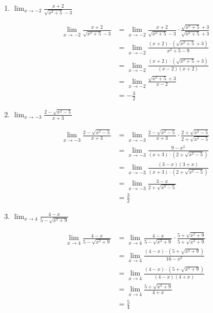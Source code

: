\documentclass[a4paper, 12pt]{article}
\begin{document}
\begin{enumerate}
    \item $\lim_{x \to -2} \frac{x+2}{\sqrt{x^2 + 5} - 3}$

    \begin{align*}
        \lim_{x \to -2} \frac{x+2}{\sqrt{x^2 + 5} - 3} &= \lim_{x \to -2} \frac{x+2}{\sqrt{x^2 + 5} - 3} \cdot  \frac{\sqrt{x^2 + 5} + 3}{\sqrt{x^2 + 5} + 3} \\
        &= \lim_{x \to -2} \frac{(x+2) \cdot (\sqrt{x^2 + 5} + 3)}{x^2 + 5 - 9}\\
        &= \lim_{x \to -2} \frac{(x+2) \cdot (\sqrt{x^2 + 5} + 3)}{(x-2)(x+2)}\\
        &= \lim_{x \to -2} \frac{\sqrt{x^2 + 5} + 3}{x-2}\\
        &= -\frac{3}{2}
    \end{align*}

    \item $\lim_{x \to -3} \frac{2-\sqrt{x^2 - 5}}{x+3}$
    
    \begin{align*}
        \lim_{x \to -3} \frac{2-\sqrt{x^2 - 5}}{x+3} &= \lim_{x \to -3} \frac{2-\sqrt{x^2 - 5}}{x+3} \cdot \frac{2+\sqrt{x^2 - 5}}{2+\sqrt{x^2 - 5}}\\
        &= \lim_{x \to -3} \frac{9 - x^2}{(x+3)\cdot (2+\sqrt{x^2 - 5})}\\
        &= \lim_{x \to -3}\frac{(3-x) (3+x)}{(x+3)\cdot (2+\sqrt{x^2 - 5})}\\
        &= \lim_{x \to -3}\frac{3-x}{2+\sqrt{x^2 - 5}}\\
        &= \frac{3}{2}
    \end{align*}

    \item $\lim_{x \to 4} \frac{4-x}{5-\sqrt{x^2 + 9}}$
    
    \begin{align*}
        \lim_{x \to 4} \frac{4-x}{5-\sqrt{x^2 + 9}} &= \lim_{x \to 4} \frac{4-x}{5-\sqrt{x^2 + 9}} \cdot \frac{5+\sqrt{x^2 + 9}}{5+\sqrt{x^2 + 9}}\\
        &= \lim_{x \to 4} \frac{(4-x)\cdot (5+\sqrt{x^2 + 9})}{16-x^2}\\
        &= \lim_{x \to 4} \frac{(4-x)\cdot (5+\sqrt{x^2 + 9})}{(4-x)(4+x)}\\
        &= \lim_{x \to 4} \frac{5+\sqrt{x^2 + 9}}{4+x}\\
        &= \frac{5}{4}
    \end{align*}
\end{enumerate}
\end{document}
